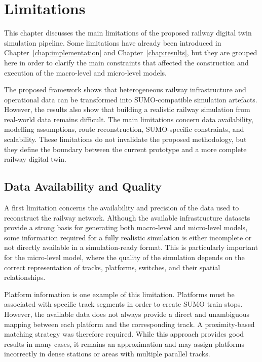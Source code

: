\chapter{Limitations}\label{chap:limitations}
This chapter discusses the main limitations of the proposed railway digital twin simulation pipeline. Some limitations 
have already been introduced in Chapter~\ref{chap:implementation} and Chapter~\ref{chap:results}, but they are grouped 
here in order to clarify the main constraints that affected the construction and execution of the macro-level and 
micro-level models.

The proposed framework shows that heterogeneous railway infrastructure and operational data can be transformed into 
SUMO-compatible simulation artefacts. However, the results also show that building a realistic railway simulation from 
real-world data remains difficult. The main limitations concern data availability, modelling assumptions, route 
reconstruction, SUMO-specific constraints, and scalability. These limitations do not invalidate the proposed methodology, 
but they define the boundary between the current prototype and a more complete railway digital twin.

\section{Data Availability and Quality}
A first limitation concerns the availability and precision of the data used to reconstruct the railway network. Although 
the available infrastructure datasets provide a strong basis for generating both macro-level and micro-level models, some 
information required for a fully realistic simulation is either incomplete or not directly available in a simulation-ready 
format. This is particularly important for the micro-level model, where the quality of the simulation depends on the 
correct representation of tracks, platforms, switches, and their spatial relationships.

Platform information is one example of this limitation. Platforms must be associated with specific track segments in order 
to create SUMO train stops. However, the available data does not always provide a direct and unambiguous mapping between 
each platform and the corresponding track. A proximity-based matching strategy was therefore required. While this approach 
provides good results in many cases, it remains an approximation and may assign platforms incorrectly in dense stations or 
areas with multiple parallel tracks.

